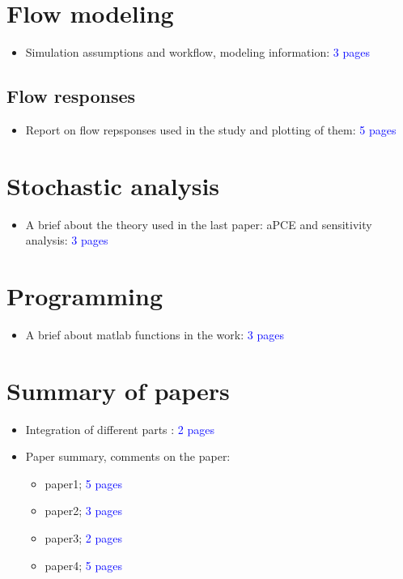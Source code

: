 \documentclass[english]{article}
\begin{document}
\section{Flow modeling}
\begin{itemize}
\item Simulation assumptions and workflow, modeling information: \textcolor{blue}{3
pages}
\end{itemize}

\subsection{Flow responses}
\begin{itemize}
\item Report on flow repsponses used in the study and plotting of them:
\textcolor{blue}{5 pages}
\end{itemize}

\section{Stochastic analysis}
\begin{itemize}
\item A brief about the theory used in the last paper: aPCE and sensitivity
analysis: \textcolor{blue}{3 pages}
\end{itemize}

\section{Programming}
\begin{itemize}
\item A brief about matlab functions in the work:\textcolor{blue}{{} 3 pages}
\end{itemize}

\section{Summary of papers}
\begin{itemize}
\item Integration of different parts : \textcolor{blue}{2 pages}
\item Paper summary, comments on the paper:

\begin{itemize}
\item paper1; \textcolor{blue}{5 pages}
\item paper2;\textcolor{blue}{{} 3 pages}
\item paper3; \textcolor{blue}{2 pages}
\item paper4; \textcolor{blue}{5 pages}
\end{itemize}
\end{itemize}
\end{document}
